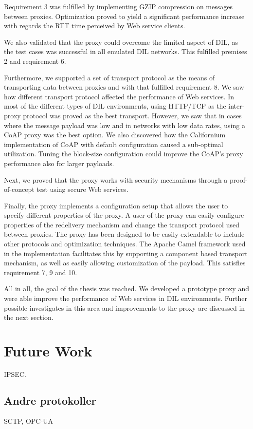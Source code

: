 Requirement 3 was fulfilled by implementing GZIP compression on messages between
proxies. Optimization proved to yield a significant performance increase with
regards the RTT time perceived by Web service clients.

We also validated that the proxy could overcome the limited aspect of DIL, as
the test cases was successful in all emulated DIL networks. This fulfilled
premises 2 and requirement 6.

Furthermore, we supported a set of transport protocol as the means of
transporting data between proxies and with that fulfilled requirement 8. We saw
how different transport protocol affected the performance of Web services. In
most of the different types of DIL environments, using HTTP/TCP as the
inter-proxy protocol was proved as the best transport. However, we saw that in
cases where the message payload was low and in networks with low data rates,
using a CoAP proxy was the best option. We also discovered how the Californium
implementation of CoAP with default configuration caused a sub-optimal
utilization. Tuning the block-size configuration could improve the CoAP's proxy
performance also for larger payloads.

Next, we proved that the proxy works with security mechanisms through a
proof-of-concept test using secure Web services.

Finally, the proxy implements a configuration setup that allows the user to
specify different properties of the proxy. A user of the proxy can easily
configure properties of the redelivery mechanism and change the transport
protocol used between proxies. The proxy has been designed to be easily
extendable to include other protocols and optimization techniques. The Apache
Camel framework used in the implementation facilitates this by supporting a
component based transport mechanism, as well as easily allowing customization of
the payload. This satisfies requirement 7, 9 and 10.


All in all, the goal of the thesis was reached. We developed a prototype proxy
and were able improve the performance of Web services in DIL environments.
Further possible investigates in this area and improvements to the proxy are
discussed in the next section.


\section{Future Work}
IPSEC.

\subsection{Andre protokoller}
SCTP, OPC-UA

